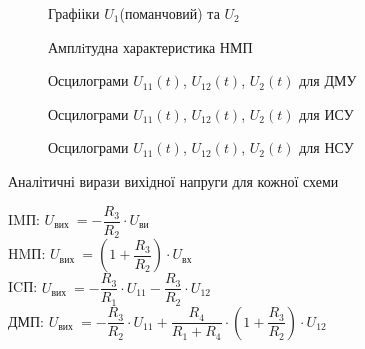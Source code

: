 \documentclass[a4paper,14pt]{extreport}
\begin{document}
\begin{figure}[h]
\begin{minipage}[h]{0.49\linewidth}
\end{minipage}
\hfill
\begin{minipage}[h]{0.49\linewidth}
\end{minipage}
\caption{Графііки $U_1$(поманчовий) та $U_2$ }
\label{ris1}
\end{figure}

\begin{figure}[h]
\caption{Амплiтудна характеристика НМП}
\end{figure}



\begin{figure}[h]
\caption{Осцилограми $U_{11}(t)$, $U_{12}(t)$, $U_2(t)$ для ДМУ}
\end{figure}


\begin{figure}[h]
\caption{Осцилограми $U_{11}(t)$, $U_{12}(t)$, $U_2(t)$ для ИСУ}
\end{figure}
\begin{figure}[h]
\caption{Осцилограми $U_{11}(t)$, $U_{12}(t)$, $U_2(t)$ для НСУ}
\end{figure}

\clearpage
\newpage
\begin{center}Аналітичні вирази вихідної напруги для кожної схеми
\end{center}\par

IMП: $U_{\text {вих }}=-\dfrac{R_{3}}{R_{2}} \cdot U_{\text {ви}}$\\

HMП: $U_{\text {вих }}=\left(1+\dfrac{R_{3}}{R_{2}}\right) \cdot U_{\text {вх}}$\\

ICП: $U_{\text {вих }}=-\dfrac{R_{3}}{R_{1}} \cdot U_{11}-\dfrac{R_{3}}{R_{2}} \cdot U_{12}$\\

ДМП: $U_{\text {вих }}=-\dfrac{R_{3}}{R_{2}} \cdot U_{11}+\dfrac{R_{4}}{R_{1}+R_{4}} \cdot\left(1+\dfrac{R_{3}}{R_{2}}\right) \cdot U_{12}$\\
\end{document}
